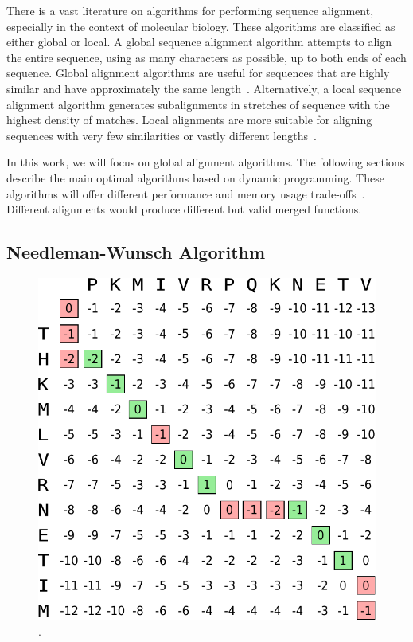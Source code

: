 There is a vast literature on algorithms for performing sequence alignment, especially in the context of molecular biology.
These algorithms are classified as either global or local.
A global sequence alignment algorithm attempts to align the entire sequence, using as many characters as possible, up to both ends of each sequence.
Global alignment algorithms are useful for sequences that are highly similar and have approximately the same length~\cite{mount05book}.
Alternatively, a local sequence alignment algorithm generates subalignments in stretches of sequence with the highest density of matches.
Local alignments are more suitable for aligning sequences with very few similarities or vastly different lengths~\cite{mount05book}.

In this work, we will focus on global alignment algorithms.
The following sections describe the main optimal algorithms based on dynamic programming.
These algorithms will offer different performance and memory usage trade-offs~\cite{needleman70,smith81,carrillo88,hickey11}.
Different alignments would produce different but valid merged functions.

\subsection{Needleman-Wunsch Algorithm}

\begin{figure}[h]
  \centering
  \includegraphics[scale=0.6]{src/background/figs/seq-align-example-nw}
  \caption{.}
  \label{fig:seq-align-example-nw}
\end{figure}

